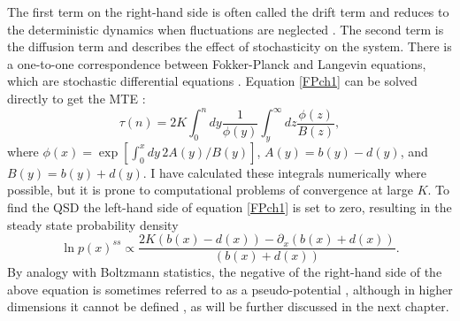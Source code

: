 The first term on the right-hand side is often called the drift term and reduces to the deterministic dynamics when fluctuations are neglected \cite{Gardiner2004}. 
The second term is the diffusion term and describes the effect of stochasticity on the system. 
There is a one-to-one correspondence between Fokker-Planck and Langevin equations, which are stochastic differential equations \cite{Gardiner2004}. 
Equation \ref{FPch1} can be solved directly to get the MTE \cite{Gardiner2004,Iyer-Biswas2015}: 
\begin{equation}
\tau(n) = 2K\int_0^n dy \frac{1}{\phi(y)} \int_y^\infty dz \frac{\phi(z)}{B(z)},
 \label{FPfull}
\end{equation}
where $\phi(x) = \exp\left[\int_0^x dy\, 2 A(y)/B(y)\right]$, $A(y) = b(y) - d(y)$, and $B(y) = b(y) + d(y)$. 
I have calculated these integrals numerically where possible, but it is prone to computational problems of convergence at large $K$. 
To find the QSD the left-hand side of equation \ref{FPch1} is set to zero, resulting in the steady state probability density \cite{Gardiner2004}
\begin{equation}
\ln p(x)^{ss} \propto \frac{2K(b(x) - d(x)) - \partial_x(b(x) + d(x))}{(b(x) + d(x))}. 
\end{equation}
By analogy with Boltzmann statistics, the negative of the right-hand side of the above equation is sometimes referred to as a pseudo-potential \cite{Roozen1987,Grasman1996,Zhou2012,Yan2013}, although in higher dimensions it cannot be defined \cite{Zhou2012,Badali2019a}, as will be further discussed in the next chapter. %

